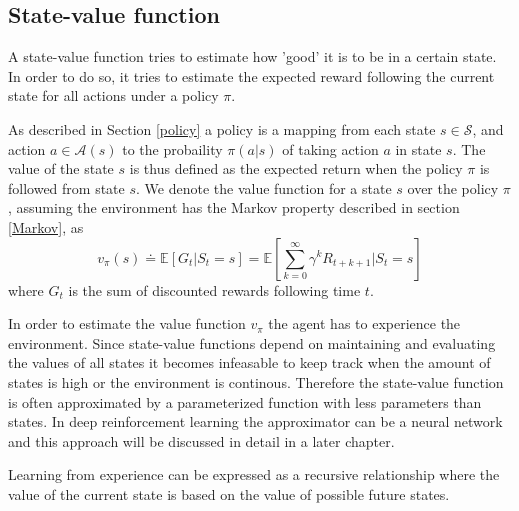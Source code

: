 \documentclass[11pt]{article}
\begin{document}
\maketitle

\subsection{State-value function}

A state-value function tries to estimate how 'good' it is to be in a certain state.
In order to do so, it tries to estimate the expected reward following the current state
for all actions under a policy $\pi$.


As described in Section \ref{policy} a policy is a mapping from each state $s \in \mathcal{S}$, and
action $a \in \mathcal{A}(s)$ to the probaility $\pi(a|s)$ of taking action $a$ in state $s$.
The value of the state $s$ is thus defined as the expected return when the policy
$\pi$ is followed from state $s$.
We denote the value function for a state $s$ over the policy $\pi$,
assuming the environment has the Markov property described in section \ref{Markov},
as
\begin{equation}\label{eqstatevalue}
    v_\pi(s) \doteq \mathds{E}[G_t | S_t = s] =
    \mathds{E}
    \left [
        \sum\limits_{k=0}^\infty \gamma^k R_{t + k + 1} | S_t = s
    \right ]
\end{equation}
where $G_t$ is the sum of discounted rewards following time $t$.

In order to estimate the value function $v_\pi$ the agent has to experience
the environment.
Since state-value functions depend on maintaining and evaluating the values of all states
it becomes infeasable to keep track when the amount of states is high or the
environment is continous.
Therefore the state-value function is often approximated by a parameterized function
with less parameters than states\cite{RLbook}.
In deep reinforcement learning the approximator can be a neural network
and this approach will be discussed in detail in a later chapter.

Learning from experience can be expressed as a recursive relationship where the
value of the current state is based on the value of possible future states.
\end{document}
